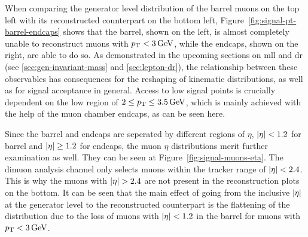 When comparing the generator level distribution of the barrel muons on the top left with its reconstructed counterpart on the bottom left, Figure~\ref{fig:signal-pt-barrel-endcaps} shows that the barrel, shown on the left, is almost completely unable to reconstruct muons with $p_{\mathrm{T}} < 3\,\text{Ge\hspace{-.08em}V}$, while the endcaps, shown on the right, are able to do so. As demonstrated in the upcoming sections on \gls{mll} and \gls{dr} (see \ref{sec:gen-invariant-mass} and \ref{sec:lepton-dr}), the relationship between these observables has consequences for the reshaping of kinematic distributions, as well as for signal acceptance in general. Access to low \dm signal points is crucially dependent on the low \pt region of $2 \leq p_{\mathrm{T}} \leq 3.5\,\text{Ge\hspace{-.08em}V}$, which is mainly achieved with the help of the muon chamber endcaps, as can be seen here.

Since the barrel and endcaps are seperated by different regions of $\eta$, $\abs{\eta} < 1.2$ for barrel and $\abs{\eta} \geq 1.2$ for endcaps, the muon $\eta$ distributions merit further examination as well. They can be seen at Figure~\ref{fig:signal-muons-eta}. The dimuon analysis channel only selects muons within the tracker range of $\abs{\eta}<2.4$. This is why the muons with $\abs{\eta}>2.4$ are not present in the reconstruction plots on the bottom. It can be seen that the main effect of going from the inclusive $\abs{\eta}$ at the generator level to the reconstructed counterpart is the flattening of the distribution due to the loss of muons with $\abs{\eta}<1.2$ in the barrel for muons with $p_{\mathrm{T}}<3\,\text{Ge\hspace{-.08em}V}$.

